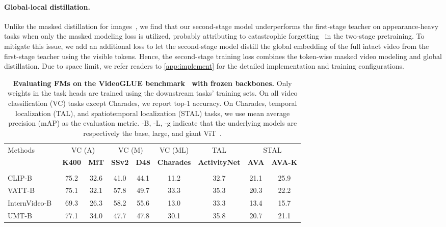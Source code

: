 \documentclass{article}
\theoremstyle{plain}
\theoremstyle{definition}
\theoremstyle{remark}
\newcommand{\tabbar}[2]{\rowcolor{gray!15} \multicolumn{#1}{l}{\textit{#2}}}
\newcommand{\myparagraph}[1]{\paragraph{#1}}
\begin{document}
\myparagraph{Global-local distillation.} Unlike the masked distillation for images~\cite{fang2022eva,fang2023eva}, we find that our second-stage model underperforms the first-stage teacher on appearance-heavy tasks when only the masked modeling loss is utilized, probably attributing to {catastrophic forgetting}~\cite{mccloskey1989catastrophic} in the two-stage pretraining. To mitigate this issue, we add an additional loss to let the second-stage model distill the global embedding of the full intact video from the first-stage teacher using the visible tokens.
Hence, the second-stage training loss combines the  token-wise masked video modeling and global distillation. Due to space limit, we refer readers to \cref{app:implement} for the detailed implementation and training configurations. \begin{table}[t]
\caption{
\textbf{Evaluating FMs on the VideoGLUE benchmark~\cite{yuan2023videoglue} with frozen backbones.} Only weights in the task heads are trained using the downstream tasks' training sets.
On all video classification (VC) tasks except Charades, we report top-1 accuracy. On Charades, temporal localization (TAL), and spatiotemporal localization (STAL) tasks, we use mean average precision (mAP) as the evaluation metric. -B, -L, -g indicate that the underlying models are respectively the base, large, and giant ViT~\cite{dosovitskiy2021image}.
}
\label{tbl:videoglue_fz_main}
\begin{center}
\begin{scriptsize}
\begin{tabular}{@{}l|cc|cc|c|c|cc@{}} 
\toprule
\multirow{2}{*}{Methods} & \multicolumn{2}{c|}{VC (A)} & \multicolumn{2}{c|}{VC (M)} & VC (ML) & TAL & \multicolumn{2}{c}{STAL} \\
& \textbf{K400} & \textbf{MiT} & \textbf{SSv2} & \textbf{D48} & \textbf{Charades} & \textbf{ActivityNet} & \textbf{AVA} & \textbf{AVA-K} \\
\midrule
\tabbar{9}{Base-scale models} \\
CLIP-B~\cite{radford2021learning} & 75.2 & 32.6 & 41.0 & 44.1 & 11.2 & 32.7 & 21.1 & 25.9 \\
VATT-B~\cite{akbari2021vatt} & 75.1 & 32.1 & 57.8 & 49.7 & 33.3 & 35.3 & 20.3 & 22.2 \\
InternVideo-B~\cite{wang2022internvideo} & 69.3 & 26.3 & 58.2 & 55.6 & 13.0 & 33.3 & 13.4 & 15.7 \\
UMT-B~\cite{li2023unmasked} & 77.1 & 34.0 & 47.7 & 47.8 & 30.1 & 35.8 & 20.7 & 21.1 \\

\end{tabular}
\end{scriptsize}
\end{center}
\end{table}
\end{document}

